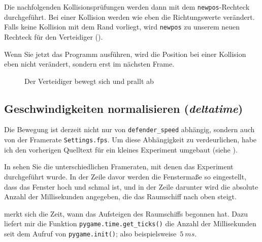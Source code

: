 Die nachfolgenden Kollisionsprüfungen werden dann mit dem \texttt{newpos}-Rechteck durchgeführt. Bei einer Kollision werden wie eben die Richtungswerte verändert. Falls keine Kollision mit dem Rand vorliegt, wird \texttt{newpos} zu unserem neuen Rechteck für den Verteidiger ().

Wenn Sie jetzt das Programm ausführen, wird die Position bei einer Kollision eben nicht verändert, sondern erst im nächsten Frame.

\begin{figure}[H]
\begin{center}
\caption{Der Verteidiger bewegt sich und prallt ab}\label{picBewegung01}
\end{center}
\end{figure}

\subsection{Geschwindigkeiten normalisieren (\emph{deltatime})}
Die Bewegung ist derzeit nicht nur von \texttt{defender\_speed} abhängig, sondern auch von der Framerate \texttt{Settings.fps}. Um diese Abhängigkeit zu verdeurlichen, habe ich den vorherigen Quelltext für ein kleines Experiment umgebaut (siehe ).

In  sehen Sie die unterschiedlichen Frameraten, mit denen das Experiment durchgeführt wurde. In der Zeile davor werden die Fenstermaße so eingestellt, dass das Fenster hoch und schmal ist, und in der Zeile darunter wird die absolute Anzahl der Millisekunden angegeben, die das Raumschiff nach oben steigt.

 merkt sich die Zeit, wann das Aufsteigen des Raumschiffs begonnen hat. Dazu liefert mir die Funktion \texttt{pygame.time.get\_ticks()} die Anzahl der Millisekunden seit dem Aufruf von \texttt{pygame.init()}; also beispielsweise~$5~ms$.


